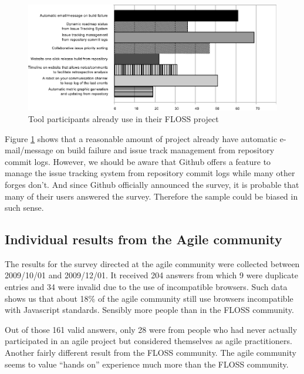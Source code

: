 \documentclass[lnbip]{svmultln}
\begin{document}
\begin{figure}[hbt]
  \centering
  \includegraphics[scale=.8]{floss-existingtools.pdf}
  \caption{Tool participants already use in their FLOSS project}
  \label{fig:floss-existingtools}
\end{figure}

Figure \ref{fig:floss-existingtools} shows that a reasonable amount of
project already have automatic e-mail/message on build failure and
issue track management from repository commit logs.  However, we
should be aware that Github offers a feature to manage the issue
tracking system from repository commit logs while many other forges
don't. And since Github officially announced the survey, it is
probable that many of their users answered the survey. Therefore the
sample could be biased in such sense.

\subsection{Individual results from the Agile community}
\label{subsec:agile-results}

The results for the survey directed at the agile community were
collected between 2009/10/01 and 2009/12/01. It received 204 answers
from which 9 were duplicate entries and 34 were invalid due to the use
of incompatible browsers. Such data shows us that about 18\% of the
agile community still use browsers incompatible with Javascript
standards. Sensibly more people than in the FLOSS community.

Out of those 161 valid answers, only 28 were from people who had never
actually participated in an agile project but considered themselves as
agile practitioners. Another fairly different result from the FLOSS
community. The agile community seems to value ``hands on'' experience
much more than the FLOSS community.
\end{document}
